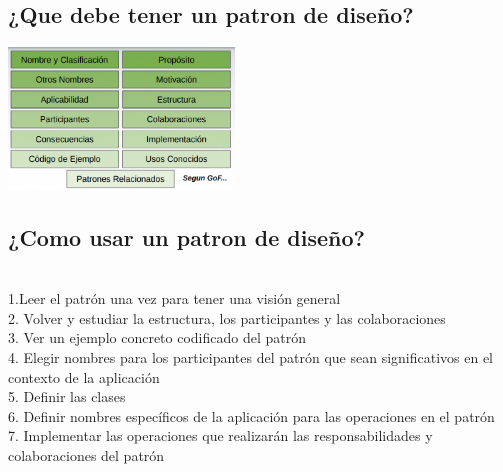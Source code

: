 \documentclass[twoside,twocolumn]{article}
\begin{document}
\subsection{¿Que debe tener un patron de diseño?}
\begin{center}
	\includegraphics[width=6cm]{./imagenes/tener.png} 
	\end{center}
\subsection{¿Como usar un patron de diseño?}
\\1.Leer el patrón una vez para tener una visión general
\\2. Volver y estudiar la estructura, los participantes y las
colaboraciones
\\3. Ver un ejemplo concreto codificado del patrón
\\4. Elegir nombres para los participantes del patrón que
sean significativos en el contexto de la aplicación
\\5. Definir las clases
\\6. Definir nombres específicos de la aplicación para las operaciones en el patrón
\\7. Implementar las operaciones que realizarán las responsabilidades y colaboraciones del patrón
\end{document}
